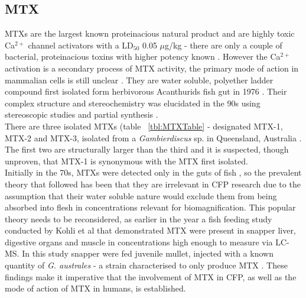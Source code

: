 \documentclass[12pt]{article}
\begin{document}
\subsection{MTX}

MTXs are the largest known proteinacious natural product \cite{yokoyama1988some,murata1993structure} and are highly toxic Ca$^{2+}$ channel activators with a LD$_{50}$ 0.05 $\mu$g/kg - there are only a couple of bacterial, proteinacious toxins with higher potency known \cite{yokoyama1988some,murata1993structure}. However the Ca$^{2+}$ activation is a secondary process of MTX activity, the primary mode of action in mammalian cells  is still unclear \cite{van2000diversity}. They are water soluble, polyether ladder compound first isolated form herbivorous Acanthurids fish gut in 1976 \cite{yasumoto1976toxicity}. Their complex structure and stereochemistry was elucidated in the 90s using stereoscopic studies and partial synthesis \cite{murata1993structure,murata1994structure,satake1995structural,nonomura1996complete,zheng1996complete}. \\
There are three isolated MTXs (table ~\ref{tbl:MTXTable} - designated MTX-1, MTX-2 and MTX-3, isolated from a \emph{Gambierdiscus} sp. in Queensland, Australia \cite{holmes1994purification}. The first two are structurally larger than the third and it is suspected, though unproven, that MTX-1 is synonymous with the MTX first isolated. \\ %
Initially in the 70s, MTXs were detected only in the guts of fish \cite{yasumoto1976toxicity}, so the prevalent theory that followed has been that they are irrelevant in CFP research due to the assumption that their water soluble nature would exclude them from being absorbed into flesh in concentrations relevant for biomagnification. This popular theory needs to be reconsidered, as earlier in the year a fish feeding study conducted by Kohli et al that demonstrated MTX were present in snapper liver, digestive organs and muscle in concentrations high enough to measure via LC-MS. In this study snapper were fed juvenile mullet, injected with a known quantity of \emph{G. australes} - a strain characterised to only produce MTX \cite{kohli2014feeding}. These findings make it imperative that the involvement of MTX in CFP, as well as the mode of action of MTX in humans, is established. 

\end{document}
